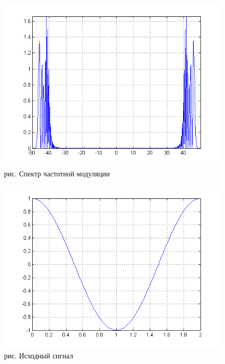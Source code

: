 \documentclass[10pt,a4paper]{report}
\begin{document}
\begin{figure}
\begin{center}
\includegraphics[width=150mm, scale = 0.9]{8_3}\newline
рис.  Спектр частотной модуляции\newline
\end{center}
\end{figure}
\begin{figure}
\begin{center}
\includegraphics[width=150mm, scale = 0.9]{8_4}\newline
рис. Исходный сигнал\newline
\end{center}
\end{figure}
\end{document}
